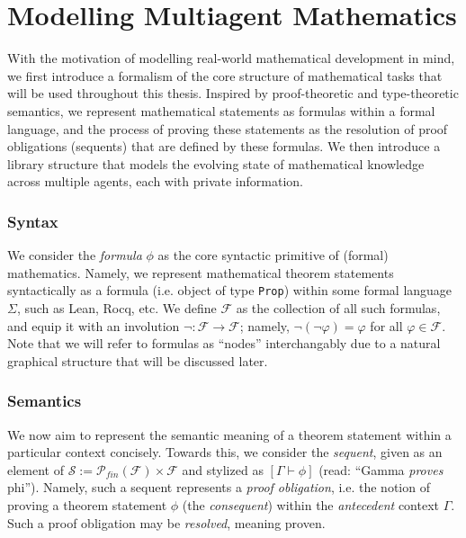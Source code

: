 \chapter{Modelling Multiagent Mathematics}\label{chap:modelling}

\newcommand{\proves}{\vdash}


With the motivation of modelling real-world mathematical development in mind, we first introduce a formalism of the core structure of mathematical tasks that will be used throughout this thesis. Inspired by proof-theoretic and type-theoretic semantics, we represent mathematical statements as formulas within a formal language, and the process of proving these statements as the resolution of proof obligations (sequents) that are defined by these formulas. We then introduce a library structure that models the evolving state of mathematical knowledge across multiple agents, each with private information.


\subsection{Syntax}

We consider the \textit{formula} $\phi$ as the core syntactic primitive of (formal) mathematics. Namely, we represent mathematical theorem statements syntactically as a formula (i.e. object of type \texttt{Prop}) within some formal language $\Sigma$, such as Lean, Rocq, etc. We define $\mathcal{F}$ as the collection of all such formulas, and equip it with an involution $\lnot : \mathcal{F}\rightarrow \mathcal{F}$; namely, $\lnot(\lnot\varphi)=\varphi$ for all $\varphi\in\mathcal{F}$. Note that we will refer to formulas as ``nodes'' interchangably due to a natural graphical structure that will be discussed later.

\subsection{Semantics}

We now aim to represent the semantic meaning of a theorem statement within a particular context concisely. Towards this, we consider the \textit{sequent}, given as an element of $\mathcal{S} := \mathcal{P}_{fin}(\mathcal{F}) \times \mathcal{F} $ and stylized as $[\Gamma \proves \phi]$ (read: ``Gamma \textit{proves} phi''). Namely, such a sequent represents a \textit{proof obligation}, i.e. the notion of proving a theorem statement $\phi$ (the \textit{consequent}) within the \textit{antecedent} context $\Gamma$. Such a proof obligation may be \textit{resolved}, meaning proven.

